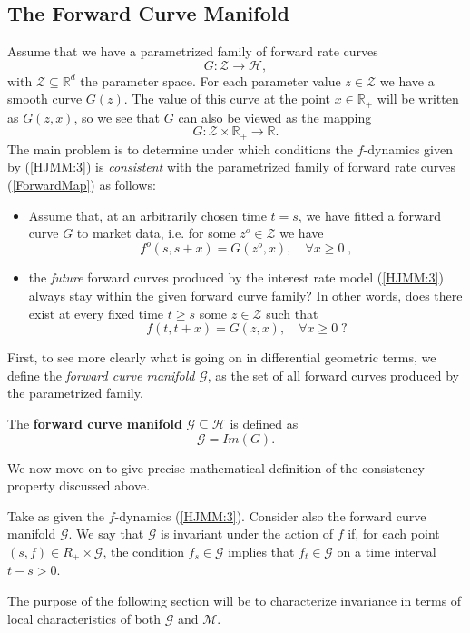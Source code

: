 \subsection{The Forward Curve Manifold}
Assume that we have a parametrized family of forward rate curves 
\begin{equation}
\label{ForwardMap}
G: \mathcal{Z} \longrightarrow \mathcal{H},
\end{equation}
with $\mathcal{Z} \subseteq \mathbb{R}^d$ the parameter space. For
each parameter value $z \in \mathcal{Z}$ we have a smooth curve
$G(z)$. The value of this curve at the point $x \in \mathbb{R}_+$ will
be written as $G(z,x)$, so we see that $G$ can also be viewed as the
mapping 
\begin{equation}
\label{ForwardMap2}
G: \mathcal{Z}\times \mathbb{R}_+ \longrightarrow \mathbb{R}.
\end{equation}
The main problem is to determine under which conditions the
$f$-dynamics given by (\ref{HJMM:3}) is {\sl consistent} with the
parametrized family of forward rate curves (\ref{ForwardMap}) as
follows: 
\begin{itemize}
\item Assume that, at an arbitrarily chosen time $t=s$, we have fitted
  a forward curve $G$ to market data, i.e. for some $z^o \in
  \mathcal{Z}$ we have 
$$
f^o(s,s+x)=G(z^o,x), \quad \forall x \geq 0\; ,
$$
\item the {\sl future} forward curves produced by the interest rate
  model (\ref{HJMM:3}) always stay within the given forward curve
  family? In other words, does there exist at every fixed time $t\geq
  s$ some $z\in \mathcal{Z}$ such that
$$
f(t,t+x)=G(z,x), \quad \forall x \geq 0\; ?
$$
\end{itemize}

First, to see more clearly what is going on in differential geometric
terms, we define the {\sl forward curve manifold} $\mathcal{G}$, as
the set of all forward curves produced by the parametrized family. 
\begin{defn} The {\bf forward curve manifold} $\mathcal {G}\subseteq
  \mathcal{H}$ is defined as
$$
\mathcal{G} = Im (G).
$$
\end{defn}
We now move on to give precise mathematical definition of the
consistency property discussed above.
\begin{defn}
Take as given the $f$-dynamics (\ref{HJMM:3}). Consider also the
forward curve manifold $\mathcal{G}$. We say that $\mathcal{G}$ is
invariant under the action of $f$ if, for each point $(s,f)\in R_+
\times \mathcal{G}$, the condition $f_s \in \mathcal{G}$ implies that
$f_t \in \mathcal{G}$ on a time interval $t-s >0$. 
\end{defn}
The purpose of the following section will be to characterize
invariance in terms of local characteristics of both $\mathcal{G}$ and
$\mathcal{M}$. 
